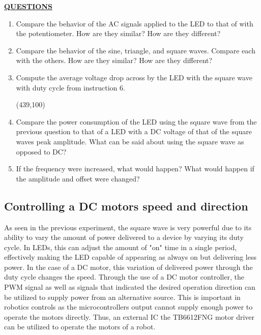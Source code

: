 \documentclass[12pt]{article}
\begin{document}
\textbf{\underline{QUESTIONS}}
\begin{enumerate}
    \item Compare the behavior of the AC signals applied to the LED to that of with the potentiometer. How are they similar? How are they different?
        \fillwithlines{0.8in}
    \item Compare the behavior of the sine, triangle, and square waves. Compare each with the others. How are they similar? How are they different?
        \fillwithlines{1.25in}
    \item Compute the average voltage drop across by the LED with the square wave with duty cycle from instruction 6.
    
        \framebox(439,100){}    
    \item Compare the power consumption of the LED using the square wave from the previous question to that of a LED with a DC voltage of that of the square waves peak amplitude. What can be said about using the square wave as opposed to DC?
        \fillwithlines{1in}
    \item If the frequency were increased, what would happen? What would happen if the amplitude and offset were changed?
        \fillwithlines{1in}
\end{enumerate}

\checkoffsubsub %

\subsection{Controlling a DC motors speed and direction}

As seen in the previous experiment, the square wave is very powerful due to its ability to vary the amount of power delivered to a device by varying its duty cycle. In LEDs, this can adjust the amount of "on" time in a single period, effectively making the LED capable of appearing as always on but delivering less power. In the case of a DC motor, this variation of delivered power through the duty cycle changes the speed. Through the use of a DC motor controller, the PWM signal as well as signals that indicated the desired operation direction can be utilized to supply power from an alternative source. This is important in robotics controls as the microcontrollers output cannot supply enough power to operate the motors directly. Thus, an external IC the TB6612FNG motor driver can be utilized to operate the motors of a robot.
\end{document}
